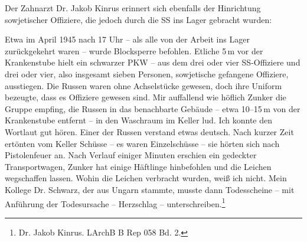 Der Zahnarzt Dr. Jakob Kinrus erinnert sich ebenfalls der Hinrichtung sowjetischer Offiziere, die jedoch durch die SS ins Lager gebracht wurden:
\begin{leftbar}
Etwa im April 1945 nach 17 Uhr -- als alle von der Arbeit ins Lager zurückgekehrt waren -- wurde Blocksperre befohlen. Etliche 5\,m vor der Krankenstube hielt ein schwarzer PKW -- aus dem drei oder vier SS-Offiziere und drei oder vier, also insgesamt sieben Personen, sowjetische gefangene Offiziere, ausstiegen. Die Russen waren ohne Achselstücke gewesen, doch ihre Uniform bezeugte, dass es Offiziere gewesen sind. Mir auffallend wie höflich Zunker die Gruppe empfing, die Russen in das benachbarte Gebäude -- etwa 10--15\,m von der Krankenstube entfernt -- in den Waschraum im Keller lud. Ich konnte den Wortlaut gut hören. Einer der Russen verstand etwas deutsch. Nach kurzer Zeit ertönten vom Keller Schüsse -- es waren Einzelschüsse -- sie hörten sich nach Pistolenfeuer an. Nach Verlauf einiger Minuten erschien ein gedeckter Transportwagen, Zunker hat einige Häftlinge hinbefohlen und die Leichen wegschaffen lassen. Wohin die Leichen verbracht wurden, weiß ich nicht. Mein Kollege Dr. Schwarz, der aus Ungarn stammte, musste dann Todesscheine -- mit Anführung der Todesursache -- Herzschlag -- unterschreiben.\footnote{Dr. Jakob Kinrus. LArchB B Rep 058 Bd. 2.}
\end{leftbar}

